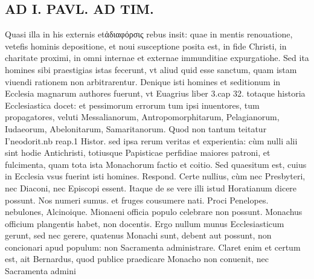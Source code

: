 \documentclass{article}
\begin{document}
\begin{pages}
\section*{AD I. PAVL. AD TIM. }
\marginpar{[ p.222 ]}\pstart Quasi illa in his externis etἀδιαφόρσις rebus insit: quae in mentis renouatione, vetefis hominis depositione, et noui susceptione posita est, in fide Christi, in charitate proximi, in omni internae et externae immunditiae expurgatiohe. Sed ita homines sibi praestigias istas fecerunt, vt aliud quid esse sanctum, quam istam viuendi rationem non arbitrarentur. Denique isti homines et seditionum in Ecclesia magnarum authores fuerunt, vt Euagrius liber 3.cap 32. totaque historia Ecclesiastica docet: et pessimorum errorum tum ipsi inuentores, tum propagatores, veluti Messalianorum, Antropomorphitarum, Pelagianorum, Iudaeorum, Abelonitarum, Samaritanorum. Quod non tantum teitatur I'neodorit.nb reap.1 Histor. sed ipsa rerum veritas et experientia: cùm nulli alii sint hodie Antichristi, totiusque Papisticae perfidiae maiores patroni, et fulcimenta, quam tota ista Monachorum factio et coitio.  \pend\pstart Sed quaesitum est, cuius in Ecclesia vsus fuerint isti homines. Respond. Certe nullius, cùm nec Presbyteri, nec Diaconi, nec Episcopi essent. Itaque  de se vere illi istud Horatianum dicere possunt. Nos numeri sumus. et fruges cousumere nati. Proci Penelopes. nebulones, Alcinoique.  \pend\pstart Mionaeni officia populo celebrare non possunt. Monachus officium plangentis habet, non docentis. Ergo nullum munus Ecclesiasticum gerunt, sed nec gerere, quatenus Monachi sunt, debent aut possunt, non concionari apud populum: non Sacramenta administrare. Claret enim et certum est, ait Bernardus, quod publice praedicare Monacho non conuenit, nec Sacramenta admini\pend

\end{pages}
\end{document}

